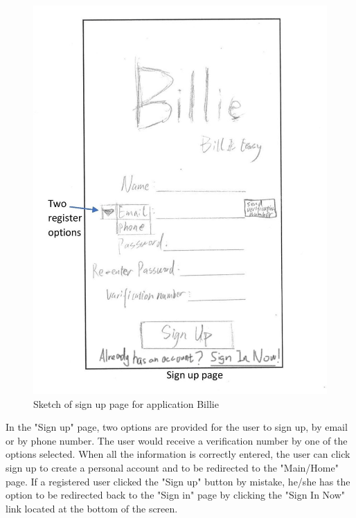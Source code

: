 \documentclass{sigchi}
\begin{document}
\begin{figure}[h!]
\centering
  \includegraphics[width=0.6\columnwidth]{2-sign-up-page.jpg}
  \caption{Sketch of sign up page for application Billie}
  \label{fig:figure17}
\end{figure}
In the "Sign up" page, two options are provided for the user to sign up, by email or by phone number. The user would receive a verification number by one of the options selected. When all the information is correctly entered, the user can click sign up to create a personal account and to be redirected to the "Main/Home" page. If a registered user clicked the "Sign up" button by mistake, he/she has the option to be redirected back to the "Sign in" page by clicking the "Sign In Now" link located at the bottom of the screen.
\end{document}
